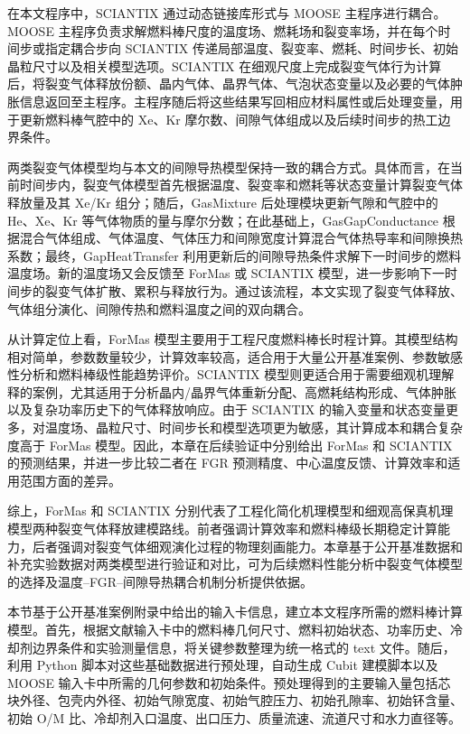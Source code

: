 在本文程序中，SCIANTIX 通过动态链接库形式与 MOOSE 主程序进行耦合。MOOSE 主程序负责求解燃料棒尺度的温度场、燃耗场和裂变率场，并在每个时间步或指定耦合步向 SCIANTIX 传递局部温度、裂变率、燃耗、时间步长、初始晶粒尺寸以及相关模型选项。SCIANTIX 在细观尺度上完成裂变气体行为计算后，将裂变气体释放份额、晶内气体、晶界气体、气泡状态变量以及必要的气体肿胀信息返回至主程序。主程序随后将这些结果写回相应材料属性或后处理变量，用于更新燃料棒气腔中的 Xe、Kr 摩尔数、间隙气体组成以及后续时间步的热工边界条件。

两类裂变气体模型均与本文的间隙导热模型保持一致的耦合方式。具体而言，在当前时间步内，裂变气体模型首先根据温度、裂变率和燃耗等状态变量计算裂变气体释放量及其 Xe/Kr 组分；随后，GasMixture 后处理模块更新气隙和气腔中的 He、Xe、Kr 等气体物质的量与摩尔分数；在此基础上，GasGapConductance 根据混合气体组成、气体温度、气体压力和间隙宽度计算混合气体热导率和间隙换热系数；最终，GapHeatTransfer 利用更新后的间隙导热条件求解下一时间步的燃料温度场。新的温度场又会反馈至 ForMas 或 SCIANTIX 模型，进一步影响下一时间步的裂变气体扩散、累积与释放行为。通过该流程，本文实现了裂变气体释放、气体组分演化、间隙传热和燃料温度之间的双向耦合。

从计算定位上看，ForMas 模型主要用于工程尺度燃料棒长时程计算。其模型结构相对简单，参数数量较少，计算效率较高，适合用于大量公开基准案例、参数敏感性分析和燃料棒级性能趋势评价。SCIANTIX 模型则更适合用于需要细观机理解释的案例，尤其适用于分析晶内/晶界气体重新分配、高燃耗结构形成、气体肿胀以及复杂功率历史下的气体释放响应。由于 SCIANTIX 的输入变量和状态变量更多，对温度场、晶粒尺寸、时间步长和模型选项更为敏感，其计算成本和耦合复杂度高于 ForMas 模型。因此，本章在后续验证中分别给出 ForMas 和 SCIANTIX 的预测结果，并进一步比较二者在 FGR 预测精度、中心温度反馈、计算效率和适用范围方面的差异。

综上，ForMas 和 SCIANTIX 分别代表了工程化简化机理模型和细观高保真机理模型两种裂变气体释放建模路线。前者强调计算效率和燃料棒级长期稳定计算能力，后者强调对裂变气体细观演化过程的物理刻画能力。本章基于公开基准数据和补充实验数据对两类模型进行验证和对比，可为后续燃料性能分析中裂变气体模型的选择及温度--FGR--间隙导热耦合机制分析提供依据。


本节基于公开基准案例附录中给出的输入卡信息，建立本文程序所需的燃料棒计算模型。首先，根据文献输入卡中的燃料棒几何尺寸、燃料初始状态、功率历史、冷却剂边界条件和实验测量信息，将关键参数整理为统一格式的 text 文件。随后，利用 Python 脚本对这些基础数据进行预处理，自动生成 Cubit 建模脚本以及 MOOSE 输入卡中所需的几何参数和初始条件。预处理得到的主要输入量包括芯块外径、包壳内外径、初始气隙宽度、初始气腔压力、初始孔隙率、初始钚含量、初始 O/M 比、冷却剂入口温度、出口压力、质量流速、流道尺寸和水力直径等。

